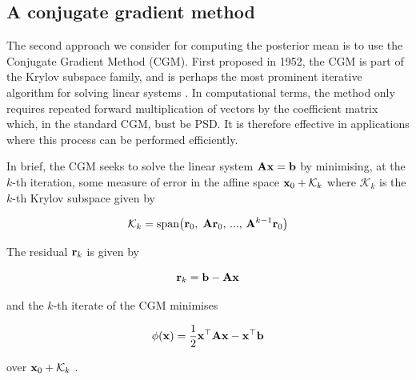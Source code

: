 \begin{algorithm}[t]
\begin{algorithmic}
        \vspace{0.15cm}
        \State{$ \F  \leftarrow \Delta\F$}
        \vspace{0.15cm}
        \vspace{0.15cm}
        \vspace{0.15cm}
        \State{$ \F \leftarrow  \F  + \Delta\F$}
        \vspace{0.15cm}
        \EndWhile
        \vspace{0.15cm}
        \Ensure{$ \F $}
        \vspace{0.15cm}
        \label{al:SIM}
    \end{algorithmic}
\end{algorithm}

\subsection{A conjugate gradient method}

\label{sec:CGM}

The second approach we consider for computing the posterior mean is to use the Conjugate Gradient Method (CGM). First proposed in 1952, the CGM is part of the Krylov subspace family, and is perhaps the most prominent iterative algorithm for solving linear systems \citep{Hestenes1952}. In computational terms, the method only requires repeated forward multiplication of vectors by the coefficient matrix which, in the standard CGM, bust be PSD. It is therefore effective in applications where this process can be performed efficiently. 

In brief, the CGM seeks to solve the linear system $\mathbf{A} \mathbf{x} = \mathbf{b}$ by minimising, at the $k$-th iteration, some measure of error in the affine space $\mathbf{x}_0 + \mathcal{K}_k$ where $\mathcal{K}_k$ is the $k$-th Krylov subspace given by  

$$
\mathcal{K}_k = \text{span}\big(\mathbf{r}_0, \; \mathbf{A} \mathbf{r}_0, \, ..., \, \mathbf{A}^{k-1} \mathbf{r}_0 \big)
$$

The residual $\mathbf{r}_k$ is given by 

$$
\mathbf{r}_k = \mathbf{b} - \mathbf{A} \mathbf{x}
$$

and the $k$-th iterate of the CGM minimises 

$$
\phi(\mathbf{x}) = \frac{1}{2} \mathbf{x}^\top \mathbf{A} \mathbf{x}  - \mathbf{x}^\top \mathbf{b}
$$

over $\mathbf{x}_0 + \mathcal{K}_k$ \citep{Kelley1995}. 

